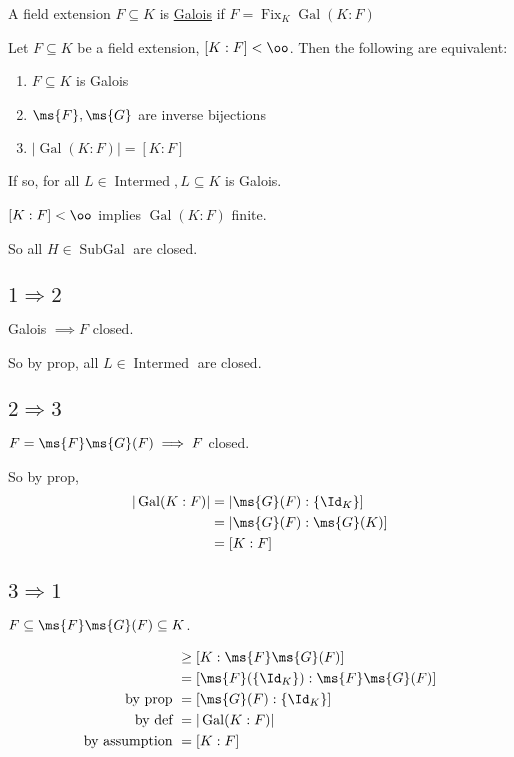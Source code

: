 \documentclass[x11names,reqno,14pt]{extarticle}
\DeclareMathOperator{\Gal}{Gal}
\DeclareMathOperator{\Fix}{Fix}
\DeclareMathOperator{\Intermed}{Intermed}
\DeclareMathOperator{\SubGal}{SubGal}
\begin{document}
A field extension $F \subseteq K$ is \underline{Galois} if $F = \Fix_K\Gal(K:F)$


Let $F \subseteq K$ be a field extension, $[K:F]<\oo$. Then the following are equivalent:
\begin{enumerate}

\item $F \subseteq K$ is Galois

\item $\ms{F},\ms{G}$ are inverse bijections

\item $|\Gal(K:F)| = [K:F]$

\end{enumerate}

If so, for all $L \in \Intermed, L \subseteq K$ is Galois.

\proof

$[K:F]<\oo$ implies $\Gal(K:F)$ finite. 

So all $H \in \SubGal$ are closed. 

\subsection*{$1\Rightarrow2$}

Galois $\implies F$ closed. 

So by prop, all $L \in \Intermed$ are closed.


\subsection*{$2\Rightarrow3$}

$F = \ms{F}\ms{G}(F) \implies F$ closed. 

So by prop, 
\begin{align*}
|\Gal(K:F)| & = |\ms{G}(F): \{\Id_K\} ] \\
& = |\ms{G}(F) : \ms{G}(K) ]\\
& = [K:F]
\end{align*}

\subsection*{$3\Rightarrow1$}

$F \subseteq \ms{F}\ms{G}(F) \subseteq K$. 

\begin{align*}
[K:F] & \geq [K:\ms{F}\ms{G}(F) ]\\
& = [\ms{F}(\{\Id_K\}):\ms{F}\ms{G}(F)] \\
\text{by prop } &= [\ms{G}(F):\{\Id_K\}]  \\
\text{by def } & =|\Gal(K:F)| \\
\text{by assumption }& = [K:F] \\
\end{align*}
\end{document}
